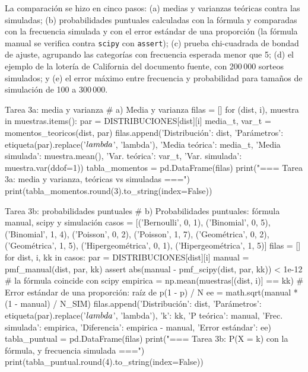 \documentclass[11pt,letterpaper]{article}
\begin{document}
La comparación se hizo en cinco pasos: (a) medias y varianzas teóricas contra las simuladas; (b) probabilidades puntuales calculadas con la fórmula y comparadas con la frecuencia simulada y con el error estándar de una proporción (la fórmula manual se verifica contra \texttt{scipy} con \texttt{assert}); (c) prueba chi-cuadrada de bondad de ajuste, agrupando las categorías con frecuencia esperada menor que 5; (d) el ejemplo de la lotería de California del documento fuente, con 200\,000 sorteos simulados; y (e) el error máximo entre frecuencia y probabilidad para tamaños de simulación de 100 a 300\,000.

\begin{codigo}[label=cod:t3a]{Tarea 3a: media y varianza}
# a) Media y varianza
filas = []
for (dist, i), muestra in muestras.items():
    par = DISTRIBUCIONES[dist][i]
    media_t, var_t = momentos_teoricos(dist, par)
    filas.append({'Distribución': dist, 'Parámetros': etiqueta(par).replace('$\\lambda$', 'lambda'),
                  'Media teórica': media_t, 'Media simulada': muestra.mean(),
                  'Var. teórica': var_t, 'Var. simulada': muestra.var(ddof=1)})
tabla_momentos = pd.DataFrame(filas)
print("\n=== Tarea 3a: media y varianza, teóricas vs simuladas ===")
print(tabla_momentos.round(3).to_string(index=False))
\end{codigo}
\begin{codigo}[label=cod:t3b]{Tarea 3b: probabilidades puntuales}
# b) Probabilidades puntuales: fórmula manual, scipy y simulación
casos = [('Bernoulli', 0, 1), ('Binomial', 0, 5), ('Binomial', 1, 4), ('Poisson', 0, 2),
         ('Poisson', 1, 7), ('Geométrica', 0, 2), ('Geométrica', 1, 5),
         ('Hipergeométrica', 0, 1), ('Hipergeométrica', 1, 5)]
filas = []
for dist, i, kk in casos:
    par = DISTRIBUCIONES[dist][i]
    manual = pmf_manual(dist, par, kk)
    assert abs(manual - pmf_scipy(dist, par, kk)) < 1e-12  # la fórmula coincide con scipy
    empirica = np.mean(muestras[(dist, i)] == kk)
    # Error estándar de una proporción: raíz de p(1 - p) / N
    ee = math.sqrt(manual * (1 - manual) / N_SIM)
    filas.append({'Distribución': dist, 'Parámetros': etiqueta(par).replace('$\\lambda$', 'lambda'),
                  'k': kk, 'P teórica': manual, 'Frec. simulada': empirica,
                  'Diferencia': empirica - manual, 'Error estándar': ee})
tabla_puntual = pd.DataFrame(filas)
print("\n=== Tarea 3b: P(X = k) con la fórmula, y frecuencia simulada ===")
print(tabla_puntual.round(4).to_string(index=False))
\end{codigo}
\end{document}
